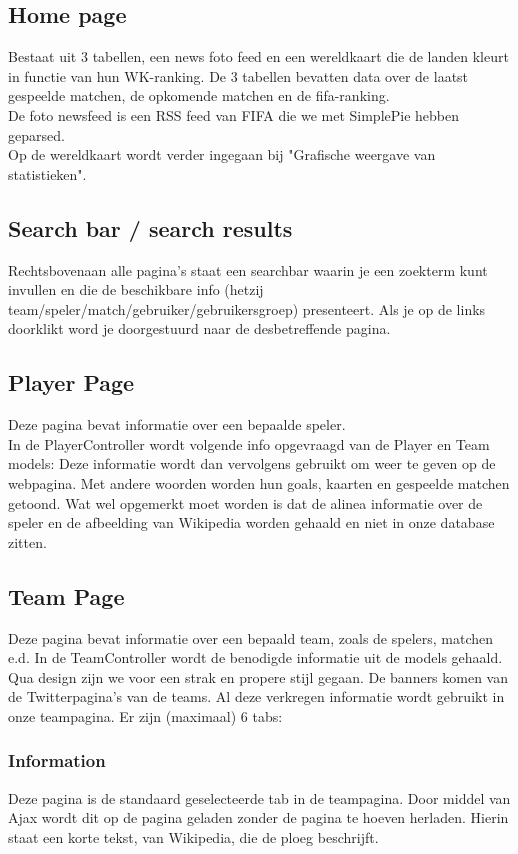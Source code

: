 \documentclass[11pt, a4paper]{article}
\begin{document}
\subsection{Home page}
Bestaat uit 3 tabellen, een news foto feed en een wereldkaart die de landen kleurt in functie van hun WK-ranking.
De 3 tabellen bevatten data over de laatst gespeelde matchen, de opkomende matchen en de fifa-ranking.
\\
De foto newsfeed is een RSS feed van FIFA die we met SimplePie hebben geparsed.
\\
Op de wereldkaart wordt verder ingegaan bij "Grafische weergave van statistieken".
\subsection{Search bar / search results}
Rechtsbovenaan alle pagina's staat een searchbar waarin je een zoekterm kunt invullen en die de beschikbare info (hetzij team/speler/match/gebruiker/gebruikersgroep) presenteert. Als je op de links doorklikt word je doorgestuurd naar de desbetreffende pagina.

\subsection{Player Page}
Deze pagina bevat informatie over een bepaalde speler.
\\
In de PlayerController wordt volgende info opgevraagd van de Player en Team models:
Deze informatie wordt dan vervolgens gebruikt om weer te geven op de webpagina. Met andere woorden worden hun goals, kaarten en gespeelde matchen getoond. Wat wel opgemerkt moet worden is dat de alinea informatie over de speler en de afbeelding van Wikipedia worden gehaald en niet in onze database zitten.

\subsection{Team Page}
Deze pagina bevat informatie over een bepaald team, zoals de spelers, matchen e.d.
In de TeamController wordt de benodigde informatie uit de models gehaald.
Qua design zijn we voor een strak en propere stijl gegaan. De banners komen van de Twitterpagina's van de teams.
Al deze verkregen informatie wordt gebruikt in onze teampagina. Er zijn (maximaal) 6 tabs:
\subsubsection{Information}
Deze pagina is de standaard geselecteerde tab in de teampagina. Door middel van Ajax wordt dit op de pagina geladen zonder de pagina te hoeven herladen.
Hierin staat een korte tekst, van Wikipedia, die de ploeg beschrijft.
\end{document}
